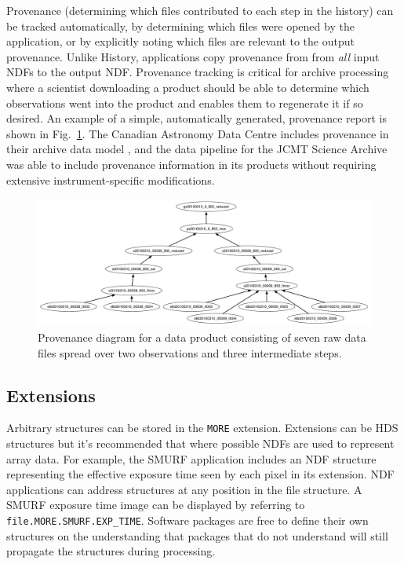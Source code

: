 \documentclass[11pt,twoside]{article}
\begin{document}
Provenance (determining which files contributed to each step in the
history) can be tracked automatically, by determining which files were
opened by the application, or by explicitly noting which files are
relevant to the output provenance. Unlike History, applications copy
provenance from from \emph{all} input NDFs to the output
NDF. Provenance tracking is critical for archive processing where a
scientist downloading a product should be able to determine which
observations went into the product and enables them to regenerate it
if so desired. An example of a simple, automatically generated,
provenance report is shown in Fig.\ \ref{fig:P91_f1}. The Canadian
Astronomy Data Centre includes provenance in their archive data model
\citep[CAOM;][]{2012ASPC..461..339D,2013ASPC..475..159R}, and the data
pipeline for the JCMT Science Archive \citep{2008ASPC..394..565J} was
able to include provenance information in its products without
requiring extensive instrument-specific modifications.

\begin{figure}
\includegraphics[width=\textwidth]{P91_f1}
\caption{Provenance diagram for a data product consisting of seven raw
  data files spread over two observations and three intermediate steps.}
\label{fig:P91_f1}
\end{figure}

\subsection{Extensions}

Arbitrary structures can be stored in the \texttt{MORE}
extension. Extensions can be HDS structures but it's recommended that
where possible NDFs are used to represent array data. For example, the
SMURF application includes an NDF structure representing the effective
exposure time seen by each pixel in its extension. NDF applications
can address structures at any position in the file structure. A SMURF
exposure time image can be displayed by referring to
\texttt{file.MORE.SMURF.EXP\_TIME}. Software packages are free to
define their own structures on the understanding that packages that do
not understand will still propagate the structures during processing.
\end{document}
